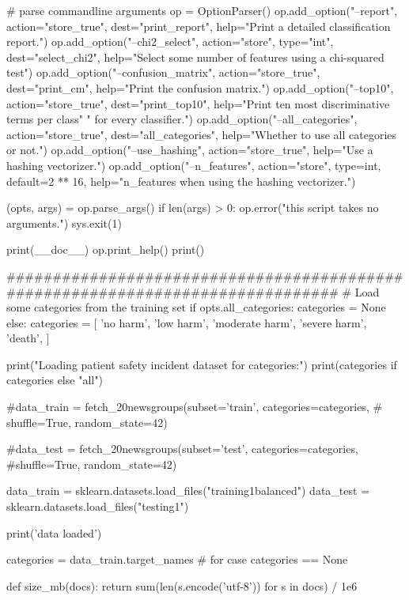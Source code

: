 \begin{pyverbatim}
# parse commandline arguments
op = OptionParser()
op.add_option("--report",
              action="store_true", dest="print_report",
              help="Print a detailed classification report.")
op.add_option("--chi2_select",
              action="store", type="int", dest="select_chi2",
              help="Select some number of features using a chi-squared test")
op.add_option("--confusion_matrix",
              action="store_true", dest="print_cm",
              help="Print the confusion matrix.")
op.add_option("--top10",
              action="store_true", dest="print_top10",
              help="Print ten most discriminative terms per class"
                   " for every classifier.")
op.add_option("--all_categories",
              action="store_true", dest="all_categories",
              help="Whether to use all categories or not.")
op.add_option("--use_hashing",
              action="store_true",
              help="Use a hashing vectorizer.")
op.add_option("--n_features",
              action="store", type=int, default=2 ** 16,
              help="n_features when using the hashing vectorizer.")


(opts, args) = op.parse_args()
if len(args) > 0:
    op.error("this script takes no arguments.")
    sys.exit(1)

print(__doc__)
op.print_help()
print()


###############################################################################
# Load some categories from the training set
if opts.all_categories:
    categories = None
else:
    categories = [
        'no harm',
        'low harm',
        'moderate harm',
        'severe harm',
        'death',
    ]

print("Loading patient safety incident dataset for categories:")
print(categories if categories else "all")

#data_train = fetch_20newsgroups(subset='train', categories=categories,
#                                shuffle=True, random_state=42)

#data_test = fetch_20newsgroups(subset='test', categories=categories,
#shuffle=True, random_state=42)

data_train = sklearn.datasets.load_files("training1balanced")
data_test = sklearn.datasets.load_files("testing1")


print('data loaded')

categories = data_train.target_names    # for case categories == None


def size_mb(docs):
    return sum(len(s.encode('utf-8')) for s in docs) / 1e6


\end{pyverbatim}
